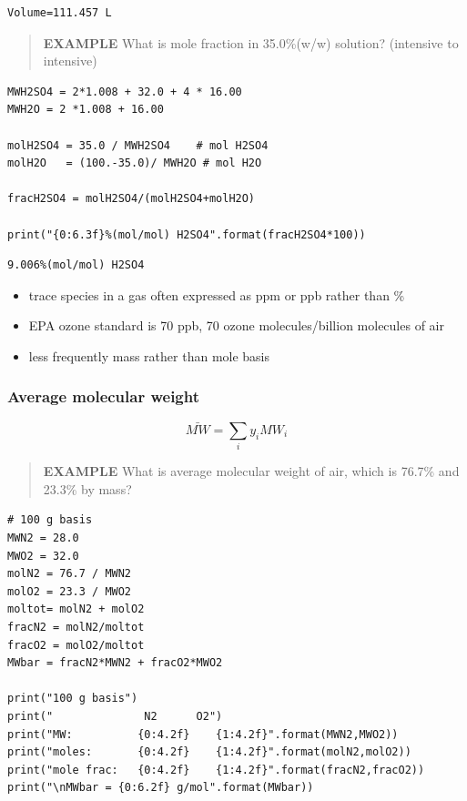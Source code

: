 \documentclass[11pt]{article}
\begin{document}
\begin{verbatim}
Volume=111.457 L
\end{verbatim}


\begin{quote}
\textbf{EXAMPLE} What is mole fraction  in 35.0\%(w/w) solution? (intensive to intensive)
\end{quote}
\begin{verbatim}
MWH2SO4 = 2*1.008 + 32.0 + 4 * 16.00
MWH2O = 2 *1.008 + 16.00

molH2SO4 = 35.0 / MWH2SO4    # mol H2SO4
molH2O   = (100.-35.0)/ MWH2O # mol H2O

fracH2SO4 = molH2SO4/(molH2SO4+molH2O)

print("{0:6.3f}%(mol/mol) H2SO4".format(fracH2SO4*100))
\end{verbatim}

\begin{verbatim}
9.006%(mol/mol) H2SO4
\end{verbatim}

\begin{itemize}
\item trace species in a gas often expressed as ppm or ppb rather than \%
\item EPA ozone standard is 70 ppb, 70 ozone molecules/billion molecules of air
\item less frequently mass rather than mole basis
\end{itemize}
\subsubsection{Average molecular weight}
\label{sec-4-5-2}
\[ \bar{MW} = \sum_{i} y_{i} MW_{i} \]

\begin{quote}
\textbf{EXAMPLE} What is average molecular weight of air, which is 76.7\%  and 23.3\%  by mass?
\end{quote}

\begin{verbatim}
# 100 g basis
MWN2 = 28.0
MWO2 = 32.0
molN2 = 76.7 / MWN2
molO2 = 23.3 / MWO2
moltot= molN2 + molO2
fracN2 = molN2/moltot
fracO2 = molO2/moltot
MWbar = fracN2*MWN2 + fracO2*MWO2

print("100 g basis")
print("              N2      O2")
print("MW:          {0:4.2f}    {1:4.2f}".format(MWN2,MWO2))
print("moles:       {0:4.2f}    {1:4.2f}".format(molN2,molO2))
print("mole frac:   {0:4.2f}    {1:4.2f}".format(fracN2,fracO2))
print("\nMWbar = {0:6.2f} g/mol".format(MWbar))
\end{verbatim}
\end{document}
